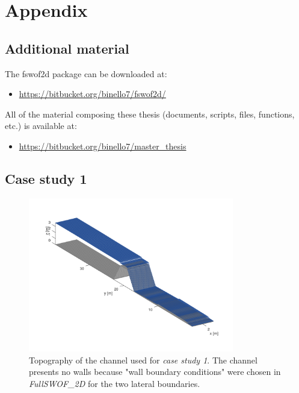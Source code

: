 \chapter{Appendix}


\section{Additional material}\label{sec:additional_material}
\noindent The  fswof2d package can be downloaded at:
\begin{itemize}
\itemsep0em
  \item \url{https://bitbucket.org/binello7/fswof2d/}
\end{itemize}

\noindent All of the material composing these thesis (documents, scripts, files, functions, etc.) is available at:
\begin{itemize}
\itemsep0em
  \item \url{https://bitbucket.org/binello7/master_thesis}
\end{itemize}



\section{Case study 1}
\begin{figure}[H]
  \centering
  \includegraphics[width=0.8\textwidth]{Figures/channel.png}
  \caption{Topography of the channel used for \emph{case study 1}. The channel presents no walls because "wall boundary conditions" were chosen in \textit{FullSWOF\_2D} for the two lateral boundaries.}
  \label{fig:channel}
\end{figure}


